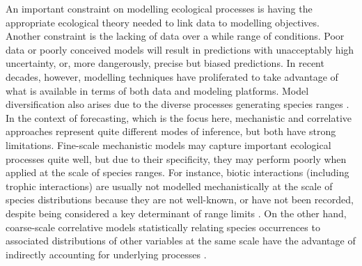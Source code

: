 An important constraint on modelling ecological processes is having the appropriate ecological theory needed to link data to modelling objectives. 
Another constraint is the lacking of data over a while range of conditions.
Poor data or poorly conceived models will result in predictions with unacceptably high uncertainty, or, more dangerously, precise but biased predictions.
In recent decades, however, modelling techniques have proliferated to take advantage of what is available in terms of both data and modeling platforms.
Model diversification also arises due to the diverse processes generating species ranges \citep{Soberon2007}.
In the context of forecasting, which is the focus here, mechanistic and correlative approaches represent quite different modes of inference, but both have strong limitations. 
Fine-scale mechanistic models may capture important ecological processes quite well, but due to their specificity, they may perform poorly when applied at the scale of species ranges.
For instance, biotic interactions (including trophic interactions) are usually not modelled mechanistically at the scale of species distributions because they are not well-known, or have not been recorded, despite being considered a key determinant of range limits \citep{Soberon2007, Roux2012, Guo2013, Pigot2013}. 
On the other hand, coarse-scale correlative models statistically relating species occurrences to associated distributions of other variables at the same scale have the advantage of indirectly accounting for underlying processes \citep{Guisan2000}.
